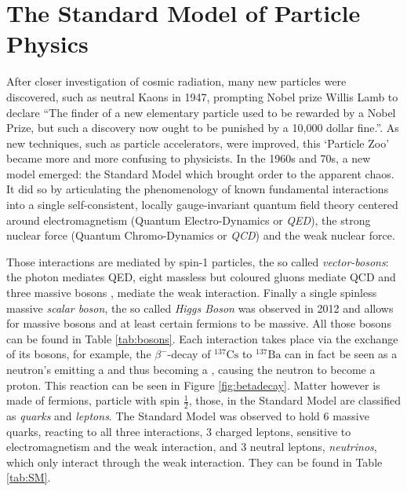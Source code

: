 
 
 \chapter{The Standard Model of Particle Physics}
 
 
 
After closer investigation of cosmic radiation, many new particles were discovered, such as neutral Kaons \PKzero in 1947, prompting Nobel prize Willis Lamb to declare ``The finder of a new elementary particle used to be rewarded by a Nobel Prize, but such a discovery now ought to be punished by a 10,000 dollar fine.''. As new techniques, such as particle accelerators, were improved, this `Particle Zoo' became more and more confusing to physicists. In the 1960s and 70s, a new model emerged: the Standard Model which brought order to the apparent chaos. It did so by articulating the phenomenology of known fundamental interactions into a single self-consistent, locally gauge-invariant quantum field theory centered around electromagnetism (Quantum Electro-Dynamics or \textit{QED}), the strong nuclear force (Quantum Chromo-Dynamics or \textit{QCD}) and the weak nuclear force.

Those interactions are mediated by spin-1 particles, the so called \textit{vector-bosons}: the photon \Pgamma mediates QED, eight massless but coloured gluons \Pgluon mediate QCD and three massive bosons \PZ, \PWpm mediate the weak interaction. Finally a single spinless massive \textit{scalar boson}, the so called \textit{Higgs Boson} was observed in 2012 and allows for massive bosons and at least certain fermions to be massive. All those bosons can be found in Table \ref{tab:bosons}. Each interaction takes place via the exchange of its bosons, for example, the $\beta^{-}$-decay of $^{137}\text{Cs}$ to $^{137}\text{Ba}$ can in fact be seen as a neutron's \Pdown emitting a \PWminus and thus becoming a \Pup, causing the neutron to become a proton. This reaction can be seen in Figure \ref{fig:betadecay}.
Matter however is made of fermions, particle with spin $\frac{1}{2}$, those, in the Standard Model are classified as \textit{quarks} and \textit{leptons}.
The Standard Model was observed to hold  6 massive quarks, reacting to all three interactions, 3 charged leptons, sensitive to electromagnetism and the weak interaction, and 3 neutral leptons, \textit{neutrinos}, which only interact through the weak interaction. They can be found in Table \ref{tab:SM}.

